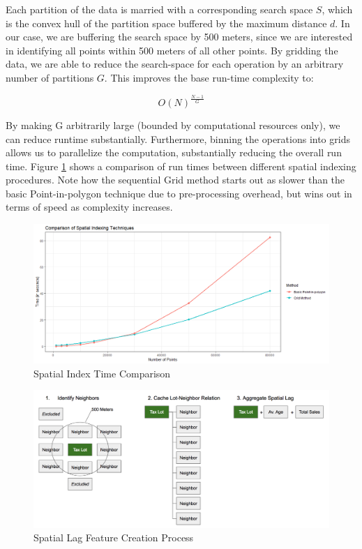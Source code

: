 \documentclass[12pt,]{article}
\begin{document}
\noindent Each partition of the data is married with a corresponding
search space \(S\), which is the convex hull of the partition space
buffered by the maximum distance \(d\). In our case, we are buffering
the search space by 500 meters, since we are interested in identifying
all points within 500 meters of all other points. By gridding the data,
we are able to reduce the search-space for each operation by an
arbitrary number of partitions \(G\). This improves the base run-time
complexity to:

\[
O(N)^\frac{N-1}{G}
\]

\noindent By making G arbitrarily large (bounded by computational
resources only), we can reduce runtime substantially. Furthermore,
binning the operations into grids allows us to parallelize the
computation, substantially reducing the overall run time. Figure
\ref{fig:Spatial Indexing Process} shows a comparison of run times
between different spatial indexing procedures. Note how the sequential
Grid method starts out as slower than the basic Point-in-polygon
technique due to pre-processing overhead, but wins out in terms of speed
as complexity increases.

\begin{figure}[h]
\includegraphics[width=1\linewidth]{Sections/tables and figures/Example Spatial Indexing Techniques} \caption{Spatial Index Time Comparison}\label{fig:Spatial Indexing Process}
\end{figure}

\begin{figure}[h]
\includegraphics[width=1\linewidth]{Sections/tables and figures/Spatial Lag Creation} \caption{Spatial Lag Feature Creation Process}\label{fig:Spatial Lag Feataure Process}
\end{figure}
\end{document}
